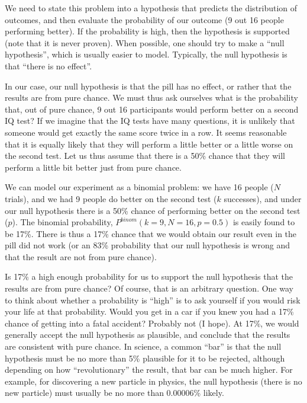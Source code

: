 We need to state this problem into a hypothesis that predicts the distribution of outcomes, and then evaluate the probability of our outcome (9 out 16 people performing better). If the probability is high, then the hypothesis is supported (note that it is never proven). When possible, one should try to make a ``null hypothesis'', which is usually easier to model. Typically, the null hypothesis is that ``there is no effect''.

In our case, our null hypothesis is that the pill has no effect, or rather that the results are from pure chance. We must thus ask ourselves what is the probability that, out of pure chance, 9 out 16 participants would perform better on a second IQ test? If we imagine that the IQ tests have many questions, it is unlikely that someone would get exactly the same score twice in a row. It seems reasonable that it is equally likely that they will perform a little better or a little worse on the second test. Let us thus assume that there is a 50\% chance that they will perform a little bit better just from pure chance.

We can model our experiment as a binomial problem: we have 16 people ($N$ trials), and we had 9 people do better on the second test ($k$ successes), and under our null hypothesis there is a 50\% chance of performing better on the second test ($p$). The binomial probability, $P^{binom}(k=9,N=16,p=0.5)$ is easily found to be 17\%. There is thus a 17\% chance that we would obtain our result even in the pill did not work (or an 83\% probability that our null hypothesis is wrong and that the result are not from pure chance).

Is 17\% a high enough probability for us to support the null hypothesis that the results are from pure chance? Of course, that is an arbitrary question. One way to think about whether a probability is ``high'' is to ask yourself if you would risk your life at that probability. Would you get in a car if you knew you had a 17\% chance of getting into a fatal accident? Probably not (I hope). At 17\%, we would generally accept the null hypothesis as plausible, and conclude that the results are consistent with pure chance. In science, a common ``bar'' is that the null hypothesis must be no more than 5\% plausible for it to be rejected, although depending on how ``revolutionary'' the result, that bar can be much higher. For example, for discovering a new particle in physics, the null hypothesis (there is no new particle) must usually be no more than 0.00006\% likely.

